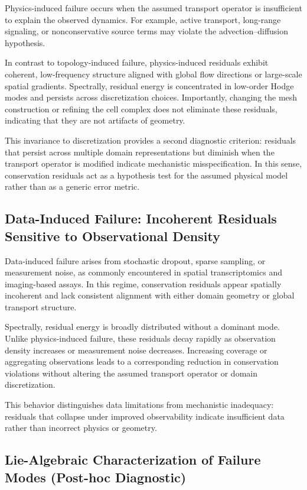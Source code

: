 \documentclass[10pt,article]{article}
\begin{document}
Physics-induced failure occurs when the assumed transport operator is insufficient to explain the observed dynamics. For example, active transport, long-range signaling, or nonconservative source terms may violate the advection–diffusion hypothesis.

In contrast to topology-induced failure, physics-induced residuals exhibit coherent, low-frequency structure aligned with global flow directions or large-scale spatial gradients. Spectrally, residual energy is concentrated in low-order Hodge modes and persists across discretization choices. Importantly, changing the mesh construction or refining the cell complex does not eliminate these residuals, indicating that they are not artifacts of geometry.

This invariance to discretization provides a second diagnostic criterion: residuals that persist across multiple domain representations but diminish when the transport operator is modified indicate mechanistic misspecification. In this sense, conservation residuals act as a hypothesis test for the assumed physical model rather than as a generic error metric.


\subsection{Data-Induced Failure: Incoherent Residuals Sensitive to Observational Density}

Data-induced failure arises from stochastic dropout, sparse sampling, or measurement noise, as commonly encountered in spatial transcriptomics and imaging-based assays. In this regime, conservation residuals appear spatially incoherent and lack consistent alignment with either domain geometry or global transport structure.

Spectrally, residual energy is broadly distributed without a dominant mode. Unlike physics-induced failure, these residuals decay rapidly as observation density increases or measurement noise decreases. Increasing coverage or aggregating observations leads to a corresponding reduction in conservation violations without altering the assumed transport operator or domain discretization.

This behavior distinguishes data limitations from mechanistic inadequacy: residuals that collapse under improved observability indicate insufficient data rather than incorrect physics or geometry.

\subsection{Lie-Algebraic Characterization of Failure Modes (Post-hoc Diagnostic)}
\end{document}
